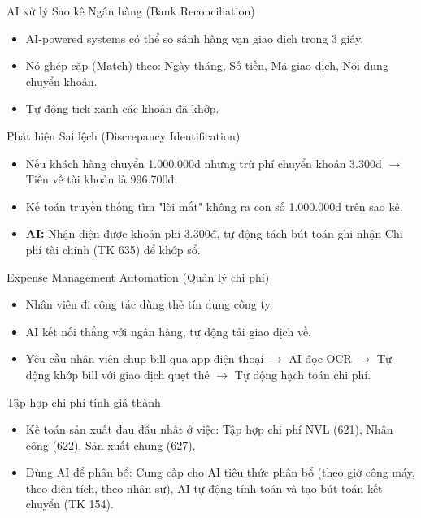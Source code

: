 \documentclass[aspectratio=169]{beamer}
\begin{document}
\begin{frame}{AI xử lý Sao kê Ngân hàng (Bank Reconciliation)}
    \begin{itemize}
        \item AI-powered systems có thể so sánh hàng vạn giao dịch trong 3 giây.
        \item Nó ghép cặp (Match) theo: Ngày tháng, Số tiền, Mã giao dịch, Nội dung chuyển khoản.
        \item Tự động tick xanh các khoản đã khớp.
    \end{itemize}
\end{frame}


\begin{frame}{Phát hiện Sai lệch (Discrepancy Identification)}
    \begin{itemize}
        \item Nếu khách hàng chuyển 1.000.000đ nhưng trừ phí chuyển khoản 3.300đ $\rightarrow$ Tiền về tài khoản là 996.700đ.
        \item Kế toán truyền thống tìm "lòi mắt" không ra con số 1.000.000đ trên sao kê.
        \item \textbf{AI:} Nhận diện được khoản phí 3.300đ, tự động tách bút toán ghi nhận Chi phí tài chính (TK 635) để khớp sổ.
    \end{itemize}
\end{frame}


\begin{frame}{Expense Management Automation (Quản lý chi phí)}
    \begin{itemize}
        \item Nhân viên đi công tác dùng thẻ tín dụng công ty.
        \item AI kết nối thẳng với ngân hàng, tự động tải giao dịch về.
        \item Yêu cầu nhân viên chụp bill qua app điện thoại $\rightarrow$ AI đọc OCR $\rightarrow$ Tự động khớp bill với giao dịch quẹt thẻ $\rightarrow$ Tự động hạch toán chi phí.
    \end{itemize}
\end{frame}


\begin{frame}{Tập hợp chi phí tính giá thành}
    \begin{itemize}
        \item Kế toán sản xuất đau đầu nhất ở việc: Tập hợp chi phí NVL (621), Nhân công (622), Sản xuất chung (627).
        \item Dùng AI để phân bổ: Cung cấp cho AI tiêu thức phân bổ (theo giờ công máy, theo diện tích, theo nhân sự), AI tự động tính toán và tạo bút toán kết chuyển (TK 154).
    \end{itemize}
\end{frame}
\end{document}
